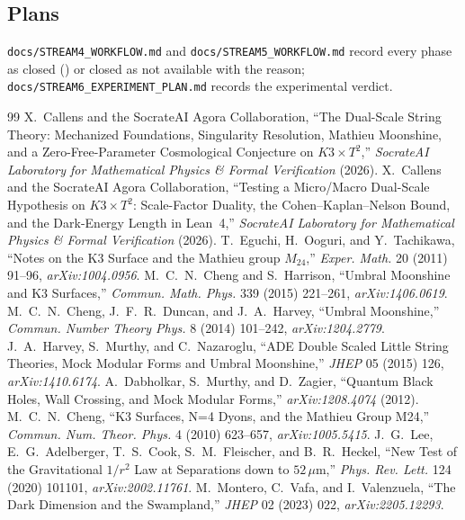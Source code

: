 \documentclass[11pt,a4paper]{article}
\theoremstyle{remark}
\begin{document}
\subsection{Plans}
\texttt{docs/STREAM4\_WORKFLOW.md} and \texttt{docs/STREAM5\_WORKFLOW.md} record every phase as closed
(\checkmark) or closed as not available with the reason; \texttt{docs/STREAM6\_EXPERIMENT\_PLAN.md} records
the experimental verdict.

\begin{thebibliography}{99}
 X.~Callens and the SocrateAI Agora Collaboration, ``The Dual-Scale String Theory: Mechanized Foundations, Singularity Resolution, Mathieu Moonshine, and a Zero-Free-Parameter Cosmological Conjecture on $K3\times T^2$,'' \textit{SocrateAI Laboratory for Mathematical Physics \& Formal Verification} (2026).
 X.~Callens and the SocrateAI Agora Collaboration, ``Testing a Micro/Macro Dual-Scale Hypothesis on $K3\times T^2$: Scale-Factor Duality, the Cohen--Kaplan--Nelson Bound, and the Dark-Energy Length in Lean~4,'' \textit{SocrateAI Laboratory for Mathematical Physics \& Formal Verification} (2026).
 T.~Eguchi, H.~Ooguri, and Y.~Tachikawa, ``Notes on the K3 Surface and the Mathieu group $M_{24}$,'' \textit{Exper. Math.} 20 (2011) 91--96, \textit{arXiv:1004.0956}.
 M.~C.~N.~Cheng and S.~Harrison, ``Umbral Moonshine and K3 Surfaces,'' \textit{Commun. Math. Phys.} 339 (2015) 221--261, \textit{arXiv:1406.0619}.
 M.~C.~N.~Cheng, J.~F.~R.~Duncan, and J.~A.~Harvey, ``Umbral Moonshine,'' \textit{Commun. Number Theory Phys.} 8 (2014) 101--242, \textit{arXiv:1204.2779}.
 J.~A.~Harvey, S.~Murthy, and C.~Nazaroglu, ``ADE Double Scaled Little String Theories, Mock Modular Forms and Umbral Moonshine,'' \textit{JHEP} 05 (2015) 126, \textit{arXiv:1410.6174}.
 A.~Dabholkar, S.~Murthy, and D.~Zagier, ``Quantum Black Holes, Wall Crossing, and Mock Modular Forms,'' \textit{arXiv:1208.4074} (2012).
 M.~C.~N.~Cheng, ``K3 Surfaces, N=4 Dyons, and the Mathieu Group M24,'' \textit{Commun. Num. Theor. Phys.} 4 (2010) 623--657, \textit{arXiv:1005.5415}.
 J.~G.~Lee, E.~G.~Adelberger, T.~S.~Cook, S.~M.~Fleischer, and B.~R.~Heckel, ``New Test of the Gravitational $1/r^2$ Law at Separations down to $52\,\mu$m,'' \textit{Phys. Rev. Lett.} 124 (2020) 101101, \textit{arXiv:2002.11761}.
 M.~Montero, C.~Vafa, and I.~Valenzuela, ``The Dark Dimension and the Swampland,'' \textit{JHEP} 02 (2023) 022, \textit{arXiv:2205.12293}.
\end{thebibliography}
\end{document}
